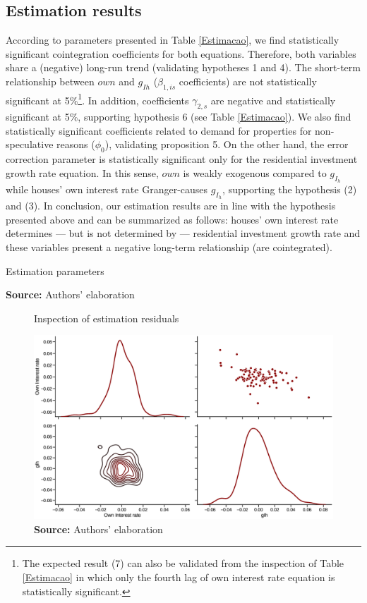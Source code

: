 \subsection{Estimation results}\label{sec:results}

According to parameters presented in Table \ref{Estimacao}, we find statistically significant cointegration  coefficients for both equations. 
Therefore, both variables share a (negative) long-run trend (validating hypotheses 1 and 4).
The short-term relationship between $own$ and $g_{Ih}$ ($\beta_{1, is}$ coefficients) are not statistically significant at 5\%\footnote{
	The expected result (7) can also be validated from the inspection of Table \ref{Estimacao} in which only the fourth lag of own interest rate equation is statistically significant.
}.
In addition, coefficients $\gamma_{2,s}$ are negative and statistically significant at 5\%, supporting hypothesis 6 (see Table  \ref{Estimacao}). 
We also find statistically significant coefficients related to demand for properties for non-speculative reasons ($\phi_0$), validating proposition 5.
On the other hand, the error correction parameter is statistically significant only for the residential investment growth rate equation.
In this sense, $own$ is weakly exogenous compared to $g_{I_h}$ while houses' own interest rate Granger-causes $g_{I_h}$, supporting the hypothesis (2) and (3).
In conclusion, our estimation results are in line with the hypothesis presented above and can be summarized as follows: houses' own interest rate determines --- but is not determined by --- residential investment growth rate and these variables present a negative long-term relationship (are cointegrated).


\begin{table}[h!]
	\caption{Estimation parameters}
	
	\caption*{\textbf{Source:} Authors' elaboration}
\end{table}

\begin{figure}
	\centering
	\caption{Inspection of estimation residuals}
	\label{residuos}
	\includegraphics[height=.4\textheight]{./figs/Residuals_4VECM.eps}
	\caption*{\textbf{Source:} Authors' elaboration}
\end{figure}



